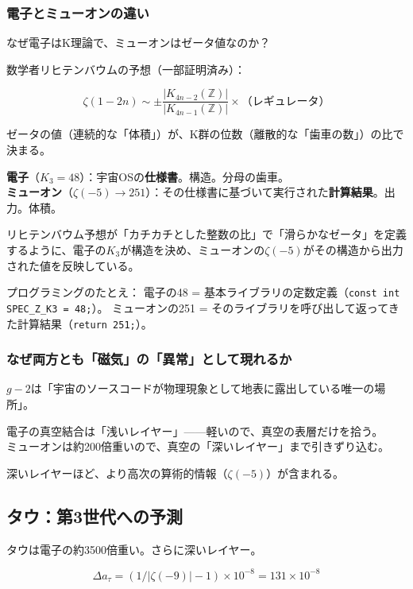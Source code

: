 \documentclass[12pt,a4paper]{article}
\begin{document}
\subsubsection{電子とミューオンの違い}

なぜ電子はK理論で、ミューオンはゼータ値なのか？

\begin{deepbox}
数学者リヒテンバウムの予想（一部証明済み）：

$$\zeta(1-2n) \sim \pm \frac{|K_{4n-2}(\mathbb{Z})|}{|K_{4n-1}(\mathbb{Z})|} \times \text{（レギュレータ）}$$

ゼータの値（連続的な「体積」）が、K群の位数（離散的な「歯車の数」）の比で決まる。

\textbf{電子}（$K_3 = 48$）：宇宙OSの\textbf{仕様書}。構造。分母の歯車。\\
\textbf{ミューオン}（$\zeta(-5) \to 251$）：その仕様書に基づいて実行された\textbf{計算結果}。出力。体積。

リヒテンバウム予想が「カチカチとした整数の比」で「滑らかなゼータ」を定義するように、電子の$K_3$が構造を決め、ミューオンの$\zeta(-5)$がその構造から出力された値を反映している。

プログラミングのたとえ：
電子の48 = 基本ライブラリの定数定義（\texttt{const int SPEC\_Z\_K3 = 48;}）。
ミューオンの251 = そのライブラリを呼び出して返ってきた計算結果（\texttt{return 251;}）。
\end{deepbox}

\subsubsection{なぜ両方とも「磁気」の「異常」として現れるか}

$g-2$は「宇宙のソースコードが物理現象として地表に露出している唯一の場所」。

電子の真空結合は「浅いレイヤー」——軽いので、真空の表層だけを拾う。\\
ミューオンは約200倍重いので、真空の「深いレイヤー」まで引きずり込む。

深いレイヤーほど、より高次の算術的情報（$\zeta(-5)$）が含まれる。

\subsection{タウ：第3世代への予測}

タウは電子の約3500倍重い。さらに深いレイヤー。

$$\Delta a_\tau = (1/|\zeta(-9)| - 1) \times 10^{-8} = 131 \times 10^{-8}$$
\end{document}
